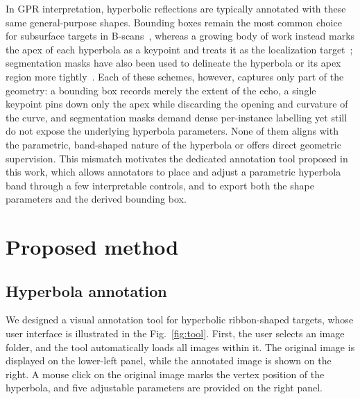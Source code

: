 \documentclass[lettersize,journal]{IEEEtran}
\begin{document}
In GPR interpretation, hyperbolic reflections are typically annotated with these same general-purpose shapes.
Bounding boxes remain the most common choice for subsurface targets in B-scans~\cite{besaw2015deep},
whereas a growing body of work instead marks the apex of each hyperbola as a keypoint and treats it as
the localization target~\cite{hou2025endtoend,lan2024statespace}; segmentation masks have also been used to
delineate the hyperbola or its apex region more tightly~\cite{hou2021msrcnn}.
Each of these schemes, however, captures only part of the geometry: a bounding box records merely the extent
of the echo, a single keypoint pins down only the apex while discarding the opening and curvature of the curve,
and segmentation masks demand dense per-instance labelling yet still do not expose the underlying hyperbola parameters.
None of them aligns with the parametric, band-shaped nature of the hyperbola or offers direct geometric supervision.
This mismatch motivates the dedicated annotation tool proposed in this work, which allows annotators to place and
adjust a parametric hyperbola band through a few interpretable controls, and to export both the shape parameters
and the derived bounding box.


\section{Proposed method}
\subsection{Hyperbola annotation}
We designed a visual annotation tool for hyperbolic ribbon-shaped targets, whose user interface is illustrated in the Fig.~\ref{fig:tool}.
First, the user selects an image folder, and the tool automatically loads all images within it.
The original image is displayed on the lower-left panel, while the annotated image is shown on the right.
A mouse click on the original image marks the vertex position of the hyperbola, and five adjustable parameters are provided on the right panel.
\end{document}
